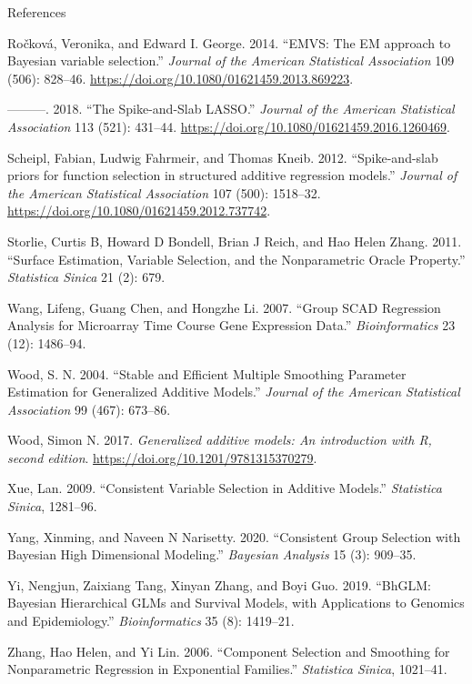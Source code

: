 \documentclass[
  ignorenonframetext,
  aspectratio=169]{beamer}
\newlength{\cslhangindent}
\newlength{\cslentryspacingunit} %
\newenvironment{CSLReferences}[2] %
 {%
  \setlength{\parindent}{0pt}
  \ifodd #1
  \let\oldpar\par
  \def\par{\hangindent=\cslhangindent\oldpar}
  \fi
  \setlength{\parskip}{#2\cslentryspacingunit}
 }%
 {}
\begin{document}
\begin{frame}[allowframebreaks]{References}
\begin{CSLReferences}{1}{0}
\leavevmode{}%
Ročková, Veronika, and Edward I. George. 2014. {``{EMVS: The EM approach
to Bayesian variable selection}.''} \emph{Journal of the American
Statistical Association} 109 (506): 828--46.
\url{https://doi.org/10.1080/01621459.2013.869223}.

\leavevmode{}%
---------. 2018. {``{The Spike-and-Slab LASSO}.''} \emph{Journal of the
American Statistical Association} 113 (521): 431--44.
\url{https://doi.org/10.1080/01621459.2016.1260469}.

\leavevmode{}%
Scheipl, Fabian, Ludwig Fahrmeir, and Thomas Kneib. 2012.
{``{Spike-and-slab priors for function selection in structured additive
regression models}.''} \emph{Journal of the American Statistical
Association} 107 (500): 1518--32.
\url{https://doi.org/10.1080/01621459.2012.737742}.

\leavevmode{}%
Storlie, Curtis B, Howard D Bondell, Brian J Reich, and Hao Helen Zhang.
2011. {``Surface Estimation, Variable Selection, and the Nonparametric
Oracle Property.''} \emph{Statistica Sinica} 21 (2): 679.

\leavevmode{}%
Wang, Lifeng, Guang Chen, and Hongzhe Li. 2007. {``Group SCAD Regression
Analysis for Microarray Time Course Gene Expression Data.''}
\emph{Bioinformatics} 23 (12): 1486--94.

\leavevmode{}%
Wood, S. N. 2004. {``Stable and Efficient Multiple Smoothing Parameter
Estimation for Generalized Additive Models.''} \emph{Journal of the
American Statistical Association} 99 (467): 673--86.

\leavevmode{}%
Wood, Simon N. 2017. \emph{{Generalized additive models: An introduction
with R, second edition}}. \url{https://doi.org/10.1201/9781315370279}.

\leavevmode{}%
Xue, Lan. 2009. {``Consistent Variable Selection in Additive Models.''}
\emph{Statistica Sinica}, 1281--96.

\leavevmode{}%
Yang, Xinming, and Naveen N Narisetty. 2020. {``Consistent Group
Selection with Bayesian High Dimensional Modeling.''} \emph{Bayesian
Analysis} 15 (3): 909--35.

\leavevmode{}%
Yi, Nengjun, Zaixiang Tang, Xinyan Zhang, and Boyi Guo. 2019. {``BhGLM:
Bayesian Hierarchical GLMs and Survival Models, with Applications to
Genomics and Epidemiology.''} \emph{Bioinformatics} 35 (8): 1419--21.

\leavevmode{}%
Zhang, Hao Helen, and Yi Lin. 2006. {``Component Selection and Smoothing
for Nonparametric Regression in Exponential Families.''}
\emph{Statistica Sinica}, 1021--41.

\end{CSLReferences}
\end{frame}
\end{document}
